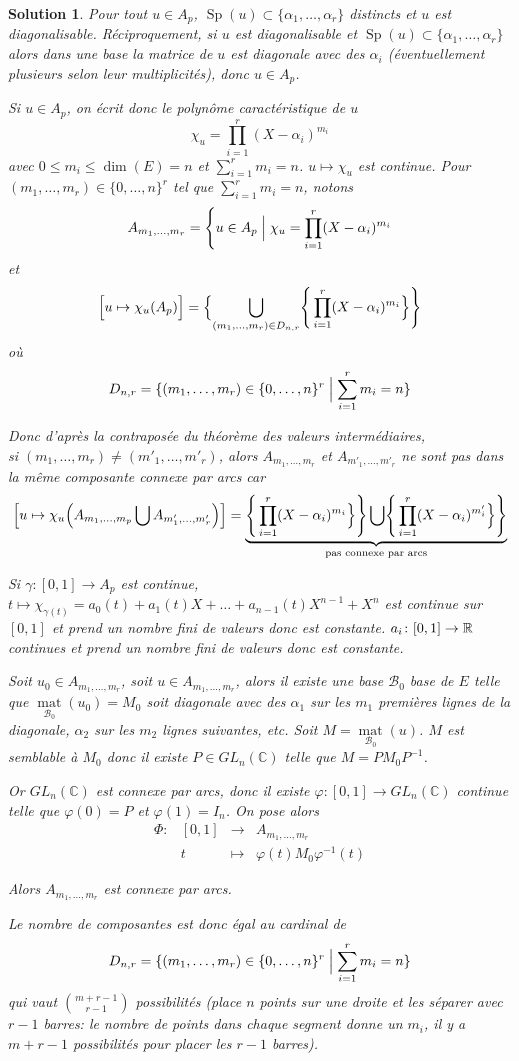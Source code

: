 \documentclass[12pt]{article}
\newtheorem{solution}{Solution}[section]
\theoremstyle{remark}
\newcommand{\C}{\mathbb{C}} \newcommand{\Q}{\mathbb{Q}}
\DeclareMathOperator{\Sp}{Sp} \DeclareMathOperator{\mat}{mat}
\newcommand{\function}[5]{
	$$
	\begin{array}{rccl}
		#1: & #2 & \to & #3 \\
		& #4 & \mapsto & #5
	\end{array}
	$$
}
\begin{document}
\begin{solution}
	Pour tout $u\in A_{p}$, $\Sp(u)\subset\{\alpha_{1},\dots,\alpha_{r}\}$ distincts et $u$ est diagonalisable. Réciproquement, si $u$ est diagonalisable et $\Sp(u)\subset\{\alpha_{1},\dots,\alpha_{r}\}$ alors dans une base la matrice de $u$ est diagonale avec des $\alpha_{i}$ (éventuellement plusieurs selon leur multiplicités), donc $u\in A_{p}$.

	Si $u\in A_{p}$, on écrit donc le polynôme caractéristique de $u$
	$$\chi_{u}=\prod_{i=1}^{r}(X-\alpha_{i})^{m_{i}}$$
	avec $0\leqslant m_{i}\leqslant\dim(E)=n$ et $\sum_{i=1}^{r}m_{i}=n$.
	$u\mapsto\chi_{u}$ est continue. Pour $(m_{1},\dots,m_{r})\in\{0,\dots,n\}^{r}$ tel que $\sum_{i=1}^{r}m_{i}=n$, notons 
	$$A_{m_{1},\dots,m_{r}}=\Biggl\{u\in A_{p}\Bigm|\chi_{u}=\prod_{i=1}^{r}(X-\alpha_{i})^{m_{i}}$$
	et 
	$$\Bigl[u\mapsto\chi_u(A_{p})\Bigr]=\Bigl\{\bigcup_{(m_{1},\dots,m_{r})\in D_{n,r}}\Biggr\{\prod_{i=1}^{r}(X-\alpha_{i})^{m_{i}}\Bigr\}\Biggr\}$$
	où
	$$D_{n,r}=\{(m_{1},\dots,m_{r})\in\{0,\dots,n\}^{r}\Bigm|\sum_{i=1}^{r}m_{i}=n\}$$

	Donc d'après la contraposée du théorème des valeurs intermédiaires,\\si $(m_{1},\dots,m_{r})\neq(m'_{1},\dots,m'_{r})$, alors $A_{m_{1},\dots,m_{r}}$ et $A_{m'_{1},\dots,m'_{r}}$ ne sont pas dans la même composante connexe par arcs car
	$$\Bigl[u\mapsto\chi_u\Bigl(A_{m_{1},\dots,m_{p}}\bigcup A_{m'_{1},\dots,m'_{r}}\Bigr)\Bigr]=\underbrace{\Biggr\{\prod_{i=1}^{r}(X-\alpha_{i})^{m_{i}}\Bigr\}\Biggr\}\bigcup\Biggr\{\prod_{i=1}^{r}(X-\alpha_{i})^{m'_{i}}\Bigr\}\Biggr\}}_{\text{pas connexe par arcs}}$$
	
	Si $\gamma\colon[0,1]\to A_{p}$ est continue, $t\mapsto\chi_{\gamma(t)}=a_{0}(t)+a_{1}(t)X+\dots+a_{n-1}(t)X^{n-1}+X^{n}$ est continue sur $[0,1]$ et prend un nombre fini de valeurs donc est constante. $a_{i}\colon[0,1]\to\mathbb{R}$ continues et prend un nombre fini de valeurs donc est constante.

	Soit $u_{0}\in A_{m_{1},\dots,m_{r}}$, soit $u\in A_{m_{1},\dots,m_{r}}$, alors il existe une base $\mathcal{B}_{0}$ base de $E$ telle que $\mat\limits_{\mathcal{B}_{0}}(u_{0})=M_{0}$ soit diagonale avec des $\alpha_{1}$ sur les $m_{1}$ premières lignes de la diagonale, $\alpha_{2}$ sur les $m_{2}$ lignes suivantes, etc. Soit $M=\mat\limits_{\mathcal{B}_{0}}(u)$. $M$ est semblable à $M_{0}$ donc il existe $P\in GL_{n}(\C)$ telle que $M=PM_{0}P^{-1}$.

	Or $GL_{n}(\C)$ est connexe par arcs, donc il existe $\varphi\colon[0,1]\to GL_{n}(\C)$ continue telle que $\varphi(0)=P$ et $\varphi(1)=I_{n}$. On pose alors \function{\Phi}{[0,1]}{A_{m_{1},\dots,m_{r}}}{t}{\varphi(t)M_{0}\varphi^{-1}(t)}
	Alors $A_{m_{1},\dots,m_{r}}$ est connexe par arcs.

	Le nombre de composantes est donc égal au cardinal de 
	$$D_{n,r}=\{(m_{1},\dots,m_{r})\in\{0,\dots,n\}^{r}\Bigm|\sum_{i=1}^{r}m_{i}=n\}$$
	qui vaut $\binom{m+r-1}{r-1}$ possibilités (place $n$ points sur une droite et les séparer avec $r-1$ barres: le nombre de points dans chaque segment donne un $m_{i}$, il y a $m+r-1$ possibilités pour placer les $r-1$ barres).
\end{solution}
\end{document}
